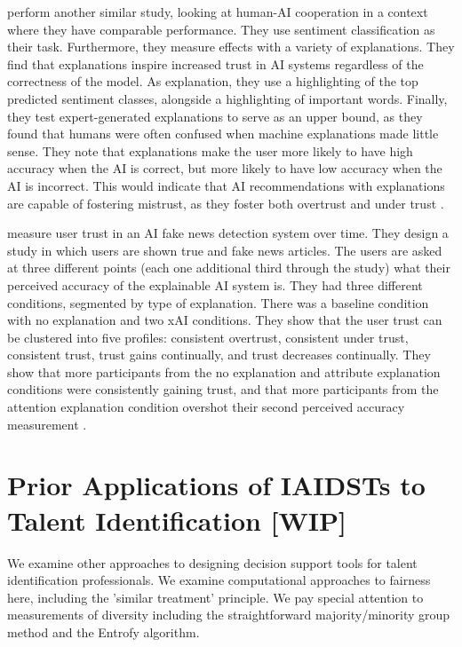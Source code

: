 \textcite{bansal_does_2021} perform another similar study, looking at human-AI cooperation in a context where they have comparable performance. They use sentiment classification as their task. Furthermore, they measure effects with a variety of explanations. They find that explanations inspire increased trust in AI systems regardless of the correctness of the model. As explanation, they use a highlighting of the top predicted sentiment classes, alongside a highlighting of important words. Finally, they test expert-generated explanations to serve as an upper bound, as they found that humans were often confused when machine explanations made little sense. They note that explanations make the user more likely to have high accuracy when the AI is correct, but more likely to have low accuracy when the AI is incorrect. This would indicate that AI recommendations with explanations are capable of fostering mistrust, as they foster both overtrust and under trust \cite{bansal_does_2021}.

\textcite{mohseni_trust_nodate} measure user trust in an AI fake news detection system over time. They design a study in which users are shown true and fake news articles. The users are asked at three different points (each one additional third through the study) what their perceived accuracy of the explainable AI system is. They had three different conditions, segmented by type of explanation. There was a baseline condition with no explanation and two xAI conditions. They show that the user trust can be clustered into five profiles: consistent overtrust, consistent under trust, consistent trust, trust gains continually, and trust decreases continually. They show that more participants from the no explanation and attribute explanation conditions were consistently gaining trust, and that more participants from the attention explanation condition overshot their second perceived accuracy measurement \cite{mohseni_trust_nodate}.

\section{Prior Applications of IAIDSTs to Talent Identification [WIP]}
We examine other approaches to designing decision support tools for talent identification professionals. We examine computational approaches to fairness here, including the 'similar treatment' principle. We pay special attention to measurements of diversity including the straightforward majority/minority group method and the Entrofy algorithm.

